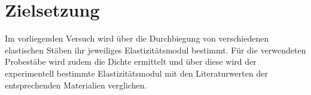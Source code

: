 \section{Zielsetzung}
\label{sec:Zielsetzung}
Im vorliegenden Versuch wird über die Durchbiegung von verschiedenen elastischen Stäben ihr jeweiliges Elastizitätsmodul bestimmt.
Für die verwendeten Probestäbe wird zudem die Dichte ermittelt und über diese wird der experimentell bestimmte Elastizitätsmodul mit den Literaturwerten der entsprechenden Materialien  verglichen.
